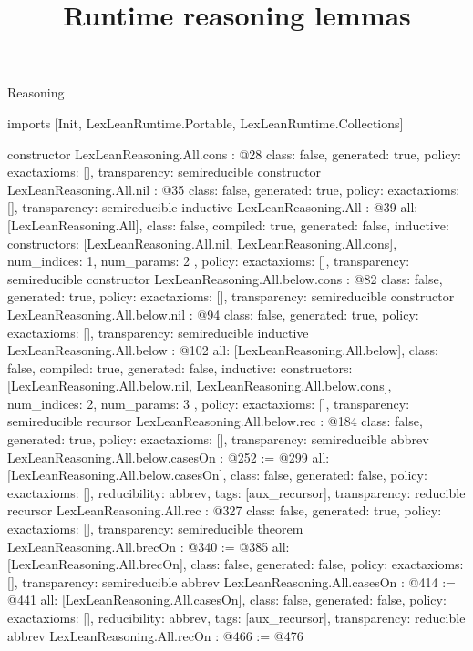 \begin{lexlean}{Reasoning}
\title{Runtime reasoning lemmas}
\begin{coremodule}
imports [Init, LexLeanRuntime.Portable, LexLeanRuntime.Collections]

constructor LexLeanReasoning.All.cons : @28 {
  class: false,
  generated: true,
  policy: exact{axioms: []},
  transparency: semireducible
}
constructor LexLeanReasoning.All.nil : @35 {
  class: false,
  generated: true,
  policy: exact{axioms: []},
  transparency: semireducible
}
inductive LexLeanReasoning.All : @39 {
  all: [LexLeanReasoning.All],
  class: false,
  compiled: true,
  generated: false,
  inductive: {
    constructors: [LexLeanReasoning.All.nil, LexLeanReasoning.All.cons],
    num_indices: 1,
    num_params: 2
  },
  policy: exact{axioms: []},
  transparency: semireducible
}
constructor LexLeanReasoning.All.below.cons : @82 {
  class: false,
  generated: true,
  policy: exact{axioms: []},
  transparency: semireducible
}
constructor LexLeanReasoning.All.below.nil : @94 {
  class: false,
  generated: true,
  policy: exact{axioms: []},
  transparency: semireducible
}
inductive LexLeanReasoning.All.below : @102 {
  all: [LexLeanReasoning.All.below],
  class: false,
  compiled: true,
  generated: false,
  inductive: {
    constructors: [LexLeanReasoning.All.below.nil, LexLeanReasoning.All.below.cons],
    num_indices: 2,
    num_params: 3
  },
  policy: exact{axioms: []},
  transparency: semireducible
}
recursor LexLeanReasoning.All.below.rec : @184 {
  class: false,
  generated: true,
  policy: exact{axioms: []},
  transparency: semireducible
}
abbrev LexLeanReasoning.All.below.casesOn : @252 := @299 {
  all: [LexLeanReasoning.All.below.casesOn],
  class: false,
  generated: false,
  policy: exact{axioms: []},
  reducibility: abbrev{},
  tags: [aux_recursor],
  transparency: reducible
}
recursor LexLeanReasoning.All.rec : @327 {
  class: false,
  generated: true,
  policy: exact{axioms: []},
  transparency: semireducible
}
theorem LexLeanReasoning.All.brecOn : @340 := @385 {
  all: [LexLeanReasoning.All.brecOn],
  class: false,
  generated: false,
  policy: exact{axioms: []},
  transparency: semireducible
}
abbrev LexLeanReasoning.All.casesOn : @414 := @441 {
  all: [LexLeanReasoning.All.casesOn],
  class: false,
  generated: false,
  policy: exact{axioms: []},
  reducibility: abbrev{},
  tags: [aux_recursor],
  transparency: reducible
}
abbrev LexLeanReasoning.All.recOn : @466 := @476 {
}
\end{coremodule}
\end{lexlean}
